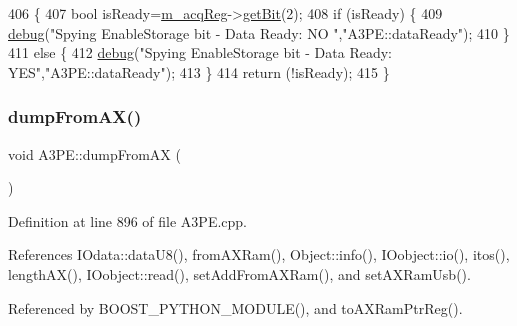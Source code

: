\begin{DoxyCode}
406                     \{
407   \textcolor{keywordtype}{bool} isReady=\hyperlink{classA3PE_abaf426f4c9192537117b77f9f4821e04}{m\_acqReg}->\hyperlink{classRegister_a5d27c9ff548817eee097ba4fdc8e8f69}{getBit}(2);
408   \textcolor{keywordflow}{if} (isReady) \{
409     \hyperlink{classObject_aac010553f022165573714b7014a15f0d}{debug}(\textcolor{stringliteral}{"Spying EnableStorage bit - Data Ready: NO "},\textcolor{stringliteral}{"A3PE::dataReady"});
410   \}
411   \textcolor{keywordflow}{else} \{
412     \hyperlink{classObject_aac010553f022165573714b7014a15f0d}{debug}(\textcolor{stringliteral}{"Spying EnableStorage bit - Data Ready: YES"},\textcolor{stringliteral}{"A3PE::dataReady"});
413   \}
414   \textcolor{keywordflow}{return} (!isReady);
415 \}
\end{DoxyCode}
\mbox{\label{classA3PE_a60a510251ec2b5fd800af2ba88e9fdac}} 
\subsubsection{\texorpdfstring{dump\+From\+A\+X()}{dumpFromAX()}}
{\footnotesize\ttfamily void A3\+P\+E\+::dump\+From\+AX (\begin{DoxyParamCaption}{ }\end{DoxyParamCaption})}



Definition at line 896 of file A3\+P\+E.\+cpp.



References I\+Odata\+::data\+U8(), from\+A\+X\+Ram(), Object\+::info(), I\+Oobject\+::io(), itos(), length\+A\+X(), I\+Oobject\+::read(), set\+Add\+From\+A\+X\+Ram(), and set\+A\+X\+Ram\+Usb().



Referenced by B\+O\+O\+S\+T\+\_\+\+P\+Y\+T\+H\+O\+N\+\_\+\+M\+O\+D\+U\+L\+E(), and to\+A\+X\+Ram\+Ptr\+Reg().


